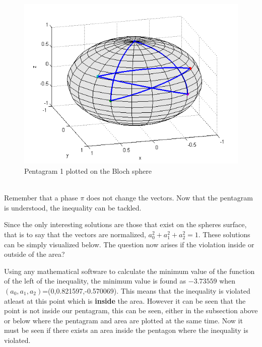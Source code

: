 \documentclass[
  utf8,%
  parskip,%
  largesmallcaps,intlimits,widermath,%
  sharecounter,nobreak,definition=marks,%
  noparts%
]{rtthesis}
\begin{document}
\begin{figure}[h!]
\begin{center}
\includegraphics[scale=0.6]{penta1.png}
\caption{Pentagram 1 plotted on the Bloch sphere}
\label{fig:penta1}
\end{center}
\end{figure}
\\
Remember that a phase $\pi$ does not change the vectors. Now that the pentagram is understood, the inequality can be tackled. 

Since the only interesting solutions are those that exist on the spheres surface, that is to say that the vectors are normalized, $a_0^2+a_1^2+a_2^2=1$. These solutions can be simply visualized below. The question now arises if the violation inside or outside of the area?

Using any mathematical software to calculate the minimum value of the function of the left of the inequality, the minimum value is found as $-3.73559$ when $(a_0,a_1,a_2)$=(0,0.821597,-0.570069). This means that the inequality is violated atleast at this point which is \textbf{inside} the area. However it can be seen that the point is not inside our pentagram, this can be seen, either in the subsection above or below where the pentagram and area are plotted at the same time.
Now it must be seen if there exists an area inside the pentagon where the inequality is violated. 
\end{document}
